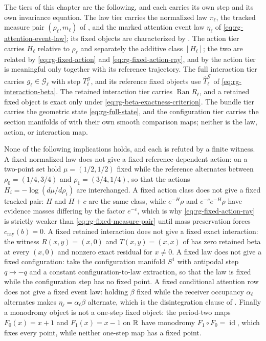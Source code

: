 The tiers of this chapter are the following, and each carries its own step and
its own invariance equation.  The law tier carries the normalized law
$\pi_\ell$, the tracked measure pair $(\rho_\ell,m_\ell)$ of
, and the marked attention event law $\eta_\ell$ of
\eqref{eq:rg-attention-event-law}; its fixed objects are characterized by
.  The action tier carries $H_\ell$ relative
to $\rho_\ell$ and separately the additive class $[H_\ell]$; the two are related
by \eqref{eq:rg-fixed-action} and \eqref{eq:rg-fixed-action-ray}, and by
 the action tier is meaningful only
together with its reference trajectory.  The full interaction tier carries
$g_\ell\in\mathcal G_\ell$ with step $T_\ell^{\mathcal G}$, and its reference
fixed objects use $\widehat T_\ell^{\mathcal G}$ of
\eqref{eq:rg-interaction-beta}.  The retained interaction tier carries
$\operatorname{Ran}R_\ell$, and a retained fixed object is exact only under
\eqref{eq:rg-beta-exactness-criterion}.  The bundle tier carries the geometric
state \eqref{eq:rg-full-state}, and the configuration tier carries the section
manifolds of  with their own smooth comparison
maps; neither is the law, action, or interaction map.

None of the following implications holds, and each is refuted by a finite
witness.  A fixed normalized law does not give a fixed reference-dependent
action: on a two-point set hold $\mu=(1/2,1/2)$ fixed while the reference
alternates between $\rho_0=(1/4,3/4)$ and $\rho_1=(3/4,1/4)$, so that the
actions $H_i=-\log(d\mu/d\rho_i)$ are interchanged.  A fixed action class does
not give a fixed tracked pair: $H$ and $H+c$ are the same class, while
$e^{-H}\rho$ and $e^{-c}e^{-H}\rho$ have evidence masses differing by the factor
$e^{-c}$, which is why \eqref{eq:rg-fixed-action-ray} is strictly weaker than
\eqref{eq:rg-fixed-measure-pair} until mass preservation forces
$c_{\mathrm{ray}}(b)=0$.  A
fixed retained interaction does not give a fixed exact interaction: the witness
$R(x,y)=(x,0)$ and $T(x,y)=(x,x)$ of
 has zero retained beta at every $(x,0)$
and nonzero exact residual for $x\neq0$.  A fixed law does not give a fixed
configuration: take the configuration manifold $S^1$ with antipodal step
$q\mapsto-q$ and a constant configuration-to-law extraction, so that the law is
fixed while the configuration step has no fixed point.  A fixed conditional
attention row does not give a fixed event law: holding $\beta$ fixed while the
receiver occupancy $\alpha_\ell$ alternates makes
$\eta_\ell=\alpha_\ell\beta$ alternate, which is the disintegration clause of
.  Finally a monodromy object is not a
one-step fixed object: the period-two maps $F_0(x)=x+1$ and $F_1(x)=x-1$ on $\mathbb R$
have monodromy $F_1\circ F_0=\operatorname{id}$, which fixes every point, while
neither one-step map has a fixed point. 

